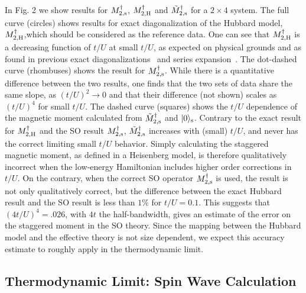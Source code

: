\documentclass[aps,prb,twocolumn,superscriptaddress,
               amsmath]{revtex4}
\renewcommand{\=}{\,=\,}
\newcommand{\+}{\,+\,}
\renewcommand{\-}{\,-\,}
\begin{document}
In Fig. 2 we show results for $M^\dagger_{2,{\rm s}}$,
                  $M^\dagger_{2,{\rm H}}$
and $\tilde M^\dagger _{2,{\rm s}}$ for a $2\times4$ system. The
full curve (circles) shows results for exact diagonalization of
the Hubbard model, $M^\dagger_{2,{\rm H}}$,which should be
considered as the reference data. One can see that $M^\dagger
_{2,{\rm H}}$ is a decreasing function of $t/U$ at small $t/U$, as
expected on physical grounds and as found in previous
exact diagonalizations~\cite{Fano} and
series expansion~\cite{Shi}. The dot-dashed curve (rhombuses) shows
the result for $M^\dagger_{2,\rm s}$. While there is a
quantitative difference between the two results, one finds that
the two sets of data share the same slope, as $(t/U)^2 \rightarrow
0$ and that their difference (not shown) scales as $(t/U)^4$ for
small $t/U$. The dashed curve (squares) shows the $t/U$ dependence
of the magnetic moment calculated from $\tilde M^\dagger _{2,{\rm
s}}$ and $\vert 0\rangle_{\rm s}$. Contrary to the exact result
for $M^\dagger_{2,{\rm H}}$ and the SO result $M^\dagger_{2,{\rm
s}}$, $\tilde M^\dagger _{2,{\rm s}}$ increases with (small)
$t/U$, and never has the correct limiting small $t/U$ behavior.
Simply calculating the staggered magnetic moment, as
defined in a Heisenberg model, is therefore qualitatively
incorrect when the low-energy
Hamiltonian includes higher order corrections in $t/U$. On the
contrary, when the correct SO operator $M^\dagger_{2,{\rm s}}$ is
used, the result is not only qualitatively correct, but the
difference between the exact Hubbard result and the SO result is
less than $1\%$ for $t/U=0.1$.  This suggests that
$(4t/U)^4=.026$, with $4t$ the half-bandwidth, gives an estimate
of the error on the staggered moment in the SO theory. Since the mapping 
between the Hubbard model and the effective theory is not size dependent, 
we expect this accuracy estimate to roughly apply 
in  the thermodynamic limit.


\subsection{Thermodynamic Limit: Spin Wave Calculation}
\end{document}
